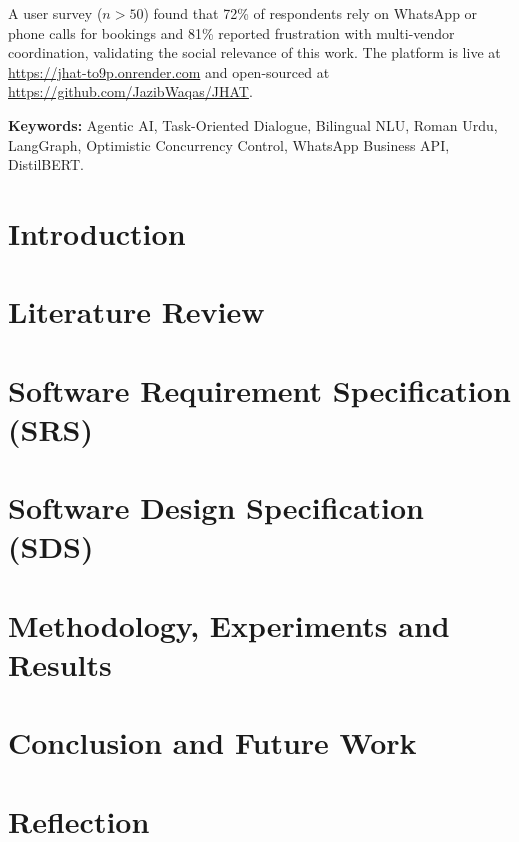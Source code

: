 \documentclass[12pt,oneside]{report}
\begin{document}
A user survey ($n>50$) found that 72\% of respondents rely on WhatsApp or phone
calls for bookings and 81\% reported frustration with multi-vendor coordination,
validating the social relevance of this work.  The platform is live at
\url{https://jhat-to9p.onrender.com} and open-sourced at
\url{https://github.com/JazibWaqas/JHAT}.

\vspace{4pt}
\noindent\textbf{Keywords:} Agentic AI, Task-Oriented Dialogue, Bilingual NLU,
Roman Urdu, LangGraph, Optimistic Concurrency Control, WhatsApp Business API,
DistilBERT.

\tableofcontents
\listoffigures
\listoftables

\chapter{Introduction}
\label{chap:intro}


\chapter{Literature Review}
\label{chap:lit}


\chapter{Software Requirement Specification (SRS)}
\label{chap:srs}


\chapter{Software Design Specification (SDS)}
\label{chap:sds}


\chapter{Methodology, Experiments and Results}
\label{chap:results}


\chapter{Conclusion and Future Work}
\label{chap:outro}


\chapter{Reflection}
\label{chap:Reflection}

\end{document}

